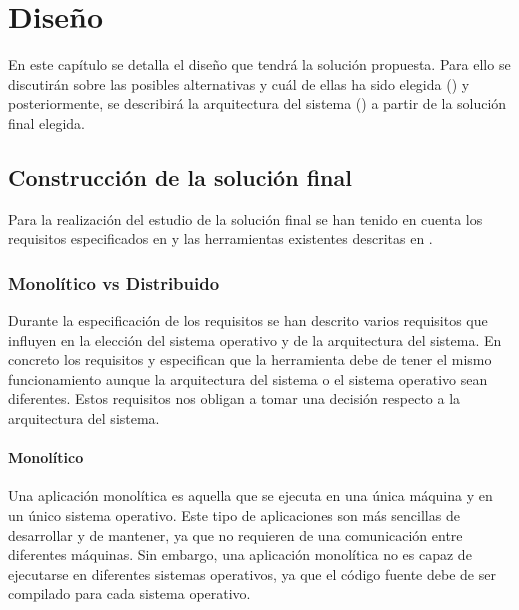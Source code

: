 \chapter{Diseño}\label{chap:diseno}

En este capítulo se detalla el diseño que tendrá la solución propuesta. Para ello se discutirán sobre las posibles alternativas y cuál de ellas ha sido elegida () y posteriormente, se describirá la arquitectura del sistema () a partir de la solución final elegida.

\section{Construcción de la solución final}\label{sec:estudio-solucion-final}

Para la realización del estudio de la solución final se han tenido en cuenta los requisitos especificados en  y las herramientas existentes descritas en . 

\subsection{Monolítico vs Distribuido} \label{subsec:monolitico-vs-distribuido}

Durante la especificación de los requisitos se han descrito varios requisitos que influyen en la elección del sistema operativo y de la arquitectura del sistema. En concreto los requisitos  y  especifican que la herramienta debe de tener el mismo funcionamiento aunque la arquitectura del sistema o el sistema operativo sean diferentes. Estos requisitos nos obligan a tomar una decisión respecto a la arquitectura del sistema. 

\subsubsection{Monolítico} \label{subsubsec:monolitico}

Una \gls{aplicación monolítica} \cite{DistributedSystems} es aquella que se ejecuta en una única máquina y en un único sistema operativo. Este tipo de aplicaciones son más sencillas de desarrollar y de mantener, ya que no requieren de una comunicación entre diferentes máquinas. Sin embargo, una \gls{aplicación monolítica} no es capaz de ejecutarse en diferentes sistemas operativos, ya que el \gls{código fuente} debe de ser compilado para cada sistema operativo. 

